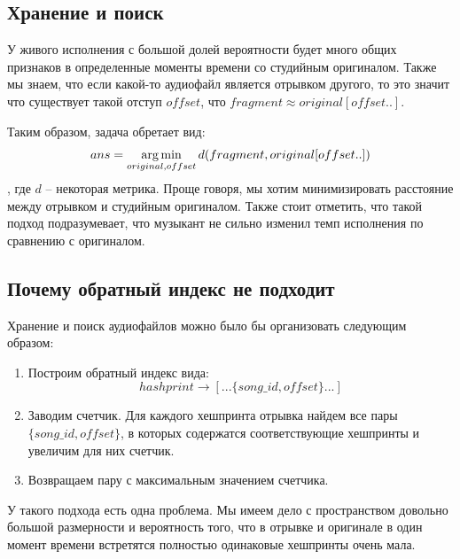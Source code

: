 \subsection{Хранение и поиск}
У живого исполнения с большой долей вероятности будет много общих признаков
в определенные моменты времени со студийным оригиналом. Также мы знаем, что
если какой-то аудиофайл является отрывком другого, то это значит что существует
такой отступ $offset$, что $fragment \approx original[offset..]$.

Таким образом, задача обретает вид:
$$ans = \operatorname*{arg\,min}_{original, offset}d(fragment, original[offset..])$$,
где $d$ -- некоторая метрика. Проще говоря, мы хотим минимизировать расстояние между
отрывком и студийным оригиналом. Также стоит отметить, что такой подход подразумевает,
что музыкант не сильно изменил темп исполнения по сравнению с оригиналом.

\subsection{Почему обратный индекс не подходит}
Хранение и поиск аудиофайлов можно было бы организовать следующим образом:
\begin{enumerate}[label=\arabic*.]
    \item Построим обратный индекс вида:
    $$hashprint \to [...\{song\_id, offset\}...]$$
    \item Заводим счетчик. Для каждого хешпринта отрывка
    найдем все пары $\{song\_id, offset\}$, в которых содержатся
    соответствующие хешпринты и увеличим для них счетчик.
    \item Возвращаем пару с максимальным значением счетчика.
\end{enumerate}
У такого подхода есть одна проблема. Мы имеем дело с пространством довольно
большой размерности и вероятность того, что в отрывке и оригинале в один момент времени
встретятся полностью одинаковые хешпринты очень мала.

